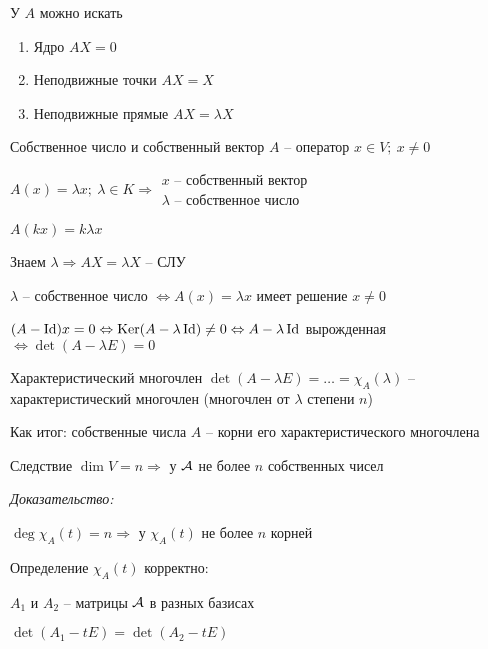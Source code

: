 \documentclass[12pt]{article}
\begin{document}
\begin{nota}{}
    У $A$ можно искать

    \begin{enumerate}
        \item Ядро $AX = 0$
        \item Неподвижные точки $AX = X$
        \item Неподвижные прямые $AX = \lambda X$
    \end{enumerate}
\end{nota}

\begin{defin}{Собственное число и собственный вектор}
    $A$ -- оператор $x \in V;\ x \neq 0$

    $A(x) = \lambda x;\ \lambda \in K \Rightarrow \begin{gathered}
        x \text{ -- собственный вектор} \\
        \lambda \text{ -- собственное число}
    \end{gathered}$

    $A(kx) = k\lambda x$

    Знаем $\lambda \Rightarrow AX = \lambda X$ -- СЛУ 

    $\lambda$ -- собственное число $\Leftrightarrow A(x) = \lambda x$ имеет решение $x \neq 0$

    $(A - \operatorname{Id})x = 0 \Leftrightarrow \operatorname{Ker}(A - \lambda \operatorname{Id}) \neq 0 \Leftrightarrow A - \lambda \operatorname{Id}$ вырожденная $\Leftrightarrow \det(A - \lambda E) = 0$
\end{defin}

\begin{defin}{Характеристический многочлен}
    $\det(A - \lambda E) = \ldots = \chi_A(\lambda)$ -- характеристический многочлен (многочлен от $\lambda$ степени $n$)
\end{defin}

\begin{Remark}{}
    Как итог: собственные числа $A$ -- корни его характеристического многочлена
\end{Remark}

\begin{theo}{Следствие}
    $\dim V = n \Rightarrow$ у $\mathcal{A}$ не более $n$ собственных чисел
\end{theo}

\textit{Доказательство:}

$\deg \chi_A(t) = n \Rightarrow$ у $\chi_A(t)$ не более $n$ корней

\begin{Remark}{}
    Определение $\chi_A(t)$ корректно:

    $A_1$ и $A_2$ -- матрицы $\mathcal{A}$ в разных базисах

    $\det(A_1 - tE) = \det(A_2 - tE)$
\end{Remark}
\end{document}
